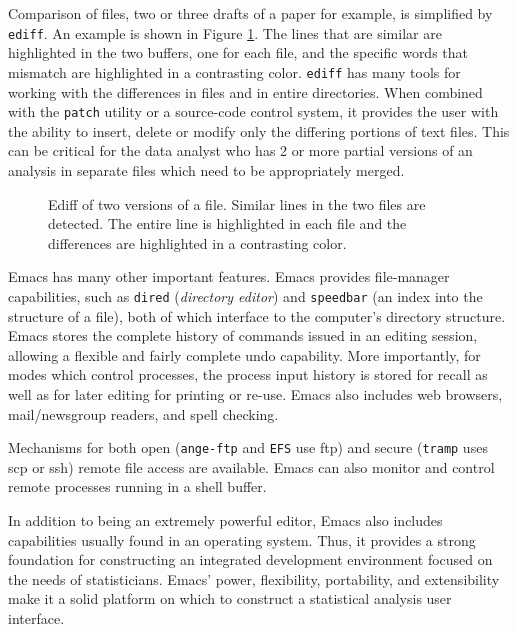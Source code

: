 \documentclass{article}
\newcommand{\stexttt}[1]{{\small\texttt{#1}}}
\begin{document}
Comparison of files, two or three drafts of a paper for example, is
simplified by \stexttt{ediff}.  An example is shown in Figure
\ref{fig:ediff}.  The lines that are similar are highlighted in the two
buffers, one for each file, and the specific words that mismatch are
highlighted in a contrasting color.  \stexttt{ediff} has many tools
for working with the differences in files and in entire directories.
When combined with the \stexttt{patch} utility or a source-code control system,
it provides the user with the ability to insert, delete or modify only
the differing portions of text files.  This can be critical for the
data analyst who has 2 or more partial versions of an analysis in separate
files which need to be appropriately merged.
\begin{figure}[tbp]
  \caption{Ediff of two versions of a file.  Similar lines in the two files
are detected.  The entire line is highlighted in each file and the differences
are highlighted in a contrasting color.}
  \label{fig:ediff}
\end{figure}

Emacs has many other important features.  Emacs provides file-manager
capabilities, such as \stexttt{dired} (\textit{directory editor}) and
\stexttt{speedbar} (an index into the structure of a file), both of
which interface to the computer's directory structure.  Emacs stores
the complete history of commands issued in an editing session,
allowing a flexible and fairly complete undo capability.  More
importantly, for modes which control processes, the process input
history is stored for recall as well as for later editing for printing
or re-use.  Emacs also includes web browsers, mail/newsgroup readers,
and spell checking.

Mechanisms for both open (\stexttt{ange-ftp} and \stexttt{EFS} use
ftp) and secure (\stexttt{tramp} uses scp or ssh) remote file access
are available.  Emacs can also monitor and control remote processes
running in a shell buffer.

In addition to being an extremely powerful editor, Emacs also includes
capabilities usually found in an operating system.  Thus, it provides
a strong foundation for constructing an integrated development
environment focused on the needs of statisticians.  Emacs' power,
flexibility, portability, and extensibility make it a solid platform
on which to construct a statistical analysis user interface.
\end{document}
